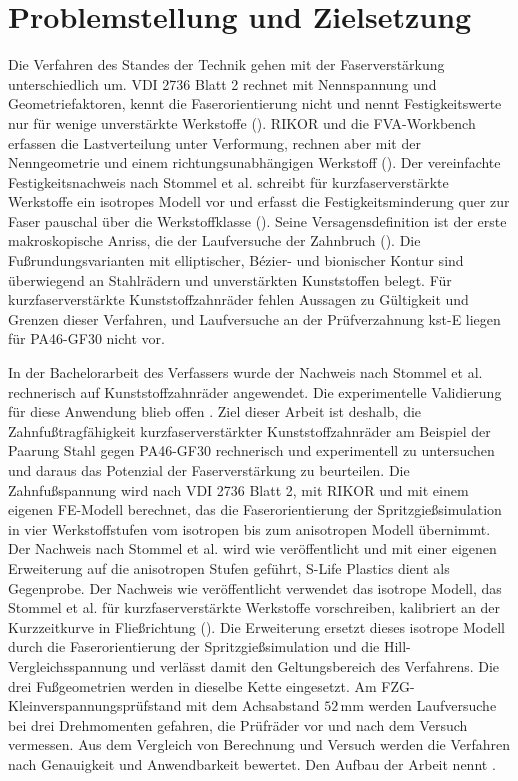 \section{Problemstellung und Zielsetzung}
\label{sec:problemstellung}

Die Verfahren des Standes der Technik gehen mit der Faserverstärkung unterschiedlich um. VDI 2736 Blatt 2 rechnet mit Nennspannung und Geometriefaktoren, kennt die Faserorientierung nicht und nennt Festigkeitswerte nur für wenige unverstärkte Werkstoffe (). RIKOR und die FVA-Workbench erfassen die Lastverteilung unter Verformung, rechnen aber mit der Nenngeometrie und einem richtungsunabhängigen Werkstoff (). Der vereinfachte Festigkeitsnachweis nach Stommel et al. schreibt für kurzfaserverstärkte Werkstoffe ein isotropes Modell vor und erfasst die Festigkeitsminderung quer zur Faser pauschal über die Werkstoffklasse (). Seine Versagensdefinition ist der erste makroskopische Anriss, die der Laufversuche der Zahnbruch (). Die Fußrundungsvarianten mit elliptischer, Bézier- und bionischer Kontur sind überwiegend an Stahlrädern und unverstärkten Kunststoffen belegt. Für kurzfaserverstärkte Kunststoffzahnräder fehlen Aussagen zu Gültigkeit und Grenzen dieser Verfahren, und Laufversuche an der Prüfverzahnung kst-E liegen für PA46-GF30 nicht vor.

In der Bachelorarbeit des Verfassers wurde der Nachweis nach Stommel et al. rechnerisch auf Kunststoffzahnräder angewendet. Die experimentelle Validierung für diese Anwendung blieb offen \cite[S.~24 und 71]{Kuh24}. Ziel dieser Arbeit ist deshalb, die Zahnfußtragfähigkeit kurzfaserverstärkter Kunststoffzahnräder am Beispiel der Paarung Stahl gegen PA46-GF30 rechnerisch und experimentell zu untersuchen und daraus das Potenzial der Faserverstärkung zu beurteilen. Die Zahnfußspannung wird nach VDI 2736 Blatt 2, mit RIKOR und mit einem eigenen FE-Modell berechnet, das die Faserorientierung der Spritzgießsimulation in vier Werkstoffstufen vom isotropen bis zum anisotropen Modell übernimmt. Der Nachweis nach Stommel et al. wird wie veröffentlicht und mit einer eigenen Erweiterung auf die anisotropen Stufen geführt, S-Life Plastics dient als Gegenprobe. Der Nachweis wie veröffentlicht verwendet das isotrope Modell, das Stommel et al. für kurzfaserverstärkte Werkstoffe vorschreiben, kalibriert an der Kurzzeitkurve in Fließrichtung (). Die Erweiterung ersetzt dieses isotrope Modell durch die Faserorientierung der Spritzgießsimulation und die Hill-Vergleichsspannung und verlässt damit den Geltungsbereich des Verfahrens. Die drei Fußgeometrien werden in dieselbe Kette eingesetzt. Am FZG-Kleinverspannungsprüfstand mit dem Achsabstand $52$\,mm werden Laufversuche bei drei Drehmomenten gefahren, die Prüfräder vor und nach dem Versuch vermessen. Aus dem Vergleich von Berechnung und Versuch werden die Verfahren nach Genauigkeit und Anwendbarkeit bewertet. Den Aufbau der Arbeit nennt .

